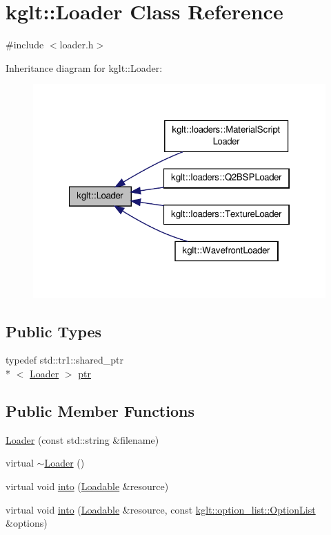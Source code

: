 \hypertarget{classkglt_1_1_loader}{\section{kglt\-:\-:Loader Class Reference}
\label{classkglt_1_1_loader}
}


{\ttfamily \#include $<$loader.\-h$>$}



Inheritance diagram for kglt\-:\-:Loader\-:\nopagebreak
\begin{figure}[H]
\begin{center}
\leavevmode
\includegraphics[width=322pt]{classkglt_1_1_loader__inherit__graph}
\end{center}
\end{figure}
\subsection*{Public Types}
\begin{DoxyCompactItemize}
\item 
typedef std\-::tr1\-::shared\-\_\-ptr\\*
$<$ \hyperlink{classkglt_1_1_loader}{Loader} $>$ \hyperlink{classkglt_1_1_loader_a8755ac58226017c031594bfd682a08f8}{ptr}
\end{DoxyCompactItemize}
\subsection*{Public Member Functions}
\begin{DoxyCompactItemize}
\item 
\hyperlink{classkglt_1_1_loader_ad01c56b33c92795b6ab57a1cd0387663}{Loader} (const std\-::string \&filename)
\item 
virtual \hyperlink{classkglt_1_1_loader_aeaa6c3c6be1e489a477c9434d048fe01}{$\sim$\-Loader} ()
\item 
virtual void \hyperlink{classkglt_1_1_loader_a898f0949522c785a66c6d395486994e5}{into} (\hyperlink{classkglt_1_1_loadable}{Loadable} \&resource)
\item 
virtual void \hyperlink{classkglt_1_1_loader_a6d7c714bae816d8cd378232902aca95e}{into} (\hyperlink{classkglt_1_1_loadable}{Loadable} \&resource, const \hyperlink{namespacekglt_1_1option__list_a6fb9461021de091004e9b8aae5847e58}{kglt\-::option\-\_\-list\-::\-Option\-List} \&options)
\end{DoxyCompactItemize}
